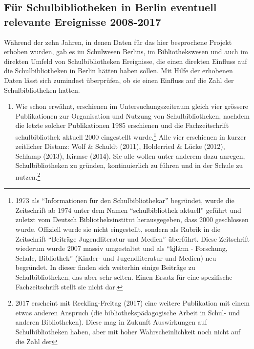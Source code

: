 \documentclass[a4paper,
fontsize=11pt,
oneside,
numbers=noperiodatend,
parskip=half-,
bibliography=totoc,
final
]{scrartcl}
\begin{document}
\subsection{Für Schulbibliotheken in Berlin eventuell relevante
Ereignisse
2008-2017}\label{fuxfcr-schulbibliotheken-in-berlin-eventuell-relevante-ereignisse-2008-2017}

Während der zehn Jahren, in denen Daten für das hier besprochene Projekt
erhoben wurden, gab es im Schulwesen Berlins, im Bibliothekswesen und
auch im direkten Umfeld von Schulbibliotheken Ereignisse, die einen
direkten Einfluss auf die Schulbibliotheken in Berlin hätten haben
sollen. Mit Hilfe der erhobenen Daten lässt sich zumindest überprüfen,
ob sie einen Einfluss auf die Zahl der Schulbibliotheken hatten.

\begin{enumerate}
\def\labelenumi{\arabic{enumi}.}
\item
  Wie schon erwähnt, erschienen im Untersuchungszeitraum gleich vier
  grössere Publikationen zur Organisation und Nutzung von
  Schulbibliotheken, nachdem die letzte solcher Publikationen 1985
  erschienen und die Fachzeitschrift schulbibliothek aktuell 2000
  eingestellt wurde.\footnote{1973 als \enquote{Informationen für den
    Schulbibliothekar} begründet, wurde die Zeitschrift ab 1974 unter
    dem Namen \enquote{schulbibliothek aktuell} geführt und zuletzt vom
    Deutsch Bibliotheksinstitut herausgegeben, dass 2000 geschlossen
    wurde. Offiziell wurde sie nicht eingestellt, sondern als Rubrik in
    die Zeitschrift \enquote{Beiträge Jugendliteratur und Medien}
    überführt. Diese Zeitschrift wiederum wurde 2007 massiv umgestaltet
    und als \enquote{kjl\&m - Forschung, Schule, Bibliothek} (Kinder-
    und Jugendliteratur und Medien) neu begründet. In dieser finden sich
    weiterhin einige Beiträge zu Schulbibliotheken, das aber sehr
    selten. Einen Ersatz für eine spezifische Fachzeitschrift stellt sie
    nicht dar.} Alle vier erschienen in kurzer zeitlicher Distanz: Wolf
  \& Schuldt (2011), Holderried \& Lücke (2012), Schlamp (2013), Kirmse
  (2014). Sie alle wollen unter anderem dazu anregen, Schulbibliotheken
  zu gründen, kontinuierlich zu führen und in der Schule zu
  nutzen.\footnote{2017 erscheint mit Reckling-Freitag (2017) eine
    weitere Publikation mit einem etwas anderen Anspruch (die
    bibliothekspädagogische Arbeit in Schul- und anderen Bibliotheken).
    Diese mag in Zukunft Auswirkungen auf Schulbibliotheken haben, aber
    mit hoher Wahrscheinlichkeit noch nicht auf die Zahl der
}
\end{enumerate}
\end{document}
